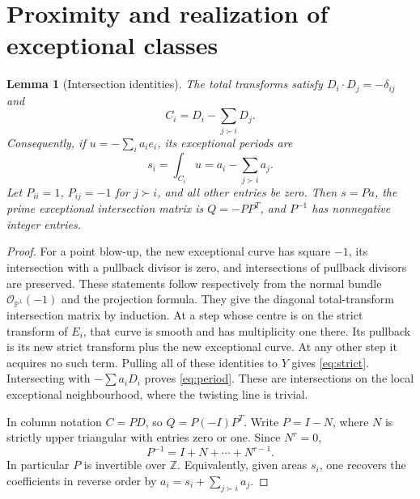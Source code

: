 \documentclass[12pt]{amsart}
\newtheorem{lem}[thm]{Lemma}
\theoremstyle{definition}
\theoremstyle{remark}
\numberwithin{equation}{section}
\newcommand{\cO}{\mathcal{O}}
\newcommand{\Z}{\mathbb{Z}}
\newcommand{\mP}{\mathbb{P}}
\begin{document}
\section{Proximity and realization of exceptional classes}\label{sec:realization}
\begin{lem}[Intersection identities]\label{lem:proximity}
The total transforms satisfy $D_i\cdot D_j=-\delta_{ij}$ and
\begin{equation}\label{eq:strict}
 C_i=D_i-\sum_{j\succ i}D_j.
\end{equation}
Consequently, if $u=-\sum_i a_i e_i$, its exceptional periods are
\begin{equation}\label{eq:period}
 s_i=\int_{C_i}u=a_i-\sum_{j\succ i}a_j.
\end{equation}
Let $P_{ii}=1$, $P_{ij}=-1$ for $j\succ i$, and all other entries be zero. Then $s=Pa$, the prime exceptional intersection matrix is $Q=-PP^T$, and $P^{-1}$ has nonnegative integer entries.
\end{lem}
\begin{proof}
For a point blow-up, the new exceptional curve has square $-1$, its intersection with a pullback divisor is zero, and intersections of pullback divisors are preserved. These statements follow respectively from the normal bundle $\cO_{\mP^1}(-1)$ and the projection formula. They give the diagonal total-transform intersection matrix by induction. At a step whose centre is on the strict transform of $E_i$, that curve is smooth and has multiplicity one there. Its pullback is its new strict transform plus the new exceptional curve. At any other step it acquires no such term. Pulling all of these identities to $Y$ gives \eqref{eq:strict}. Intersecting with $-\sum a_iD_i$ proves \eqref{eq:period}. These are intersections on the local exceptional neighbourhood, where the twisting line is trivial.

In column notation $C=PD$, so $Q=P(-I)P^T$. Write $P=I-N$, where $N$ is strictly upper triangular with entries zero or one. Since $N^r=0$,
\begin{equation}\label{eq:inverse}
 P^{-1}=I+N+\cdots+N^{r-1}.
\end{equation}
In particular $P$ is invertible over $\Z$. Equivalently, given areas $s_i$, one recovers the coefficients in reverse order by $a_i=s_i+\sum_{j\succ i}a_j$.
\end{proof}
\end{document}
